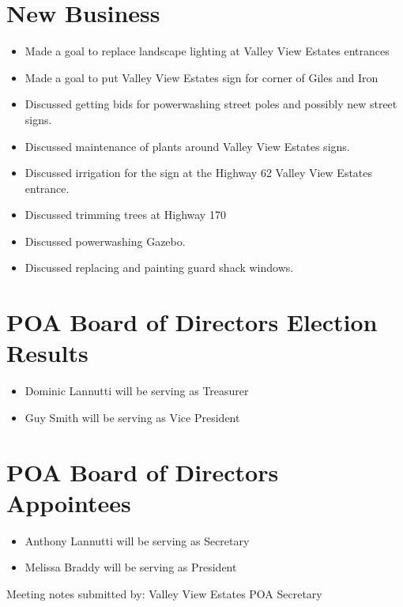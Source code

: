 \documentclass[10pt,a4paper]{article}
\begin{document}
\section*{New Business}
\begin{itemize}
  \item Made a goal to replace landscape lighting at Valley View Estates entrances
  \item Made a goal to put Valley View Estates sign for corner of Giles and Iron
  \item Discussed getting bids for powerwashing street poles and possibly new street signs.
  \item Discussed maintenance of plants around Valley View Estates signs.
  \item Discussed irrigation for the sign at the Highway 62 Valley View Estates entrance.
  \item Discussed trimming trees at Highway 170
  \item Discussed powerwashing Gazebo.
  \item Discussed replacing and painting guard shack windows.
\end{itemize}

\section*{POA Board of Directors Election Results}
\begin{itemize}
  \item Dominic Lannutti will be serving as Treasurer
  \item Guy Smith will be serving as Vice President
\end{itemize}

\section*{POA Board of Directors Appointees}
\begin{itemize}
  \item Anthony Lannutti will be serving as Secretary
  \item Melissa Braddy will be serving as President
\end{itemize}

\begin{flushleft}
Meeting notes submitted by:\break{}
\@author\break{}
Valley View Estates POA Secretary
\end{flushleft}
\end{document}
